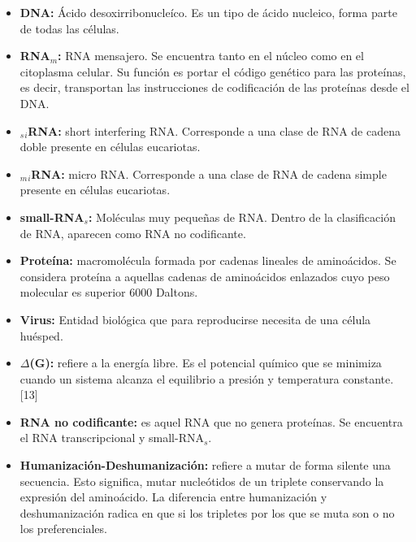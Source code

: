 \documentclass[12pt,a4paper,english,spanish]{article}
\begin{document}
\begin{itemize}
	\item \textbf{DNA:} Ácido desoxirribonucleíco. Es un tipo de ácido nucleico, forma parte de todas las células.
	\item \textbf{RNA$_m$:} RNA mensajero. Se encuentra tanto en el núcleo como en el citoplasma celular. Su función es portar el código genético para
							las proteínas, es decir, transportan las instrucciones de codificación de las proteínas desde el DNA.
	\item \textbf{$_s$$_i$RNA:} short interfering RNA. Corresponde a una clase de RNA de cadena doble presente en células eucariotas.
	\item \textbf{$_m$$_i$RNA:} micro RNA. Corresponde a una clase de RNA de cadena simple presente en células eucariotas. 
	\item \textbf{small-RNA$_s$:} Moléculas muy pequeñas de RNA. Dentro de la clasificación de RNA, aparecen como RNA no codificante.
	\item \textbf{Proteína:} macromolécula formada por cadenas lineales de aminoácidos. Se considera proteína a aquellas cadenas de aminoácidos  enlazados 								cuyo peso molecular es superior 6000 Daltons.
	\item \textbf{Virus:} Entidad biológica que para reproducirse necesita de una célula huésped.	
	\item \textbf{$\Delta$(G):} refiere a la energía libre. Es el potencial químico que se minimiza cuando un sistema alcanza el equilibrio a presión y 								temperatura constante. [13] 
	\item \textbf{RNA no codificante:} es aquel RNA que no genera proteínas. Se encuentra el RNA transcripcional y small-RNA$_s$.
	\item \textbf{Humanización-Deshumanización:} refiere a mutar de forma silente una secuencia. Esto significa, mutar nucleótidos de un triplete 													conservando la expresión del aminoácido. La diferencia entre humanización y deshumanización radica en que 													si los tripletes por los que se muta son o no los preferenciales.				

\end{itemize}
\end{document}

